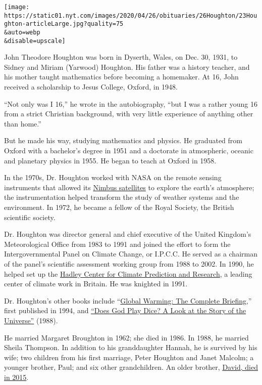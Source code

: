 \texttt{[image: https://static01.nyt.com/images/2020/04/26/obituaries/26Houghton/23Houghton-articleLarge.jpg?quality=75\\\&auto=webp\\\&disable=upscale]}

John Theodore Houghton was born in Dyserth, Wales, on Dec. 30, 1931, to
Sidney and Miriam (Yarwood) Houghton. His father was a history teacher,
and his mother taught mathematics before becoming a homemaker. At 16,
John received a scholarship to Jesus College, Oxford, in 1948.

``Not only was I 16,'' he wrote in the autobiography, ``but I was a
rather young 16 from a strict Christian background, with very little
experience of anything other than home.''

But he made his way, studying mathematics and physics. He graduated from
Oxford with a bachelor's degree in 1951 and a doctorate in atmospheric,
oceanic and planetary physics in 1955. He began to teach at Oxford in
1958.

In the 1970s, Dr. Houghton worked with NASA on the remote sensing
instruments that allowed its
\href{https://www.nasa.gov/content/goddard/nimbus-nasa-remembers-first-earth-observations}{Nimbus
satellites} to explore the earth's atmosphere; the instrumentation
helped transform the study of weather systems and the environment. In
1972, he became a fellow of the Royal Society, the British scientific
society.

Dr. Houghton was director general and chief executive of the United
Kingdom's Meteorological Office from 1983 to 1991 and joined the effort
to form the Intergovernmental Panel on Climate Change, or I.P.C.C. He
served as a chairman of the panel's scientific assessment working group
from 1988 to 2002. In 1990, he helped set up the
\href{https://www.metoffice.gov.uk/weather/climate-change/organisations-and-reports/met-office-hadley-centre}{Hadley
Center for Climate Prediction and Research}, a leading center of climate
work in Britain. He was knighted in 1991.

Dr. Houghton's other books include
``\href{https://www.amazon.com/gp/product/1107463793?ie=UTF8\&tag=thewaspos09-20\&camp=1789\&linkCode=xm2\&creativeASIN=1107463793}{Global
Warming: The Complete Briefing},'' first published in 1994, and
\href{https://www.amazon.com/Does-Play-Dice-Story-Universe/dp/0310515718}{``Does
God Play Dice? A Look at the Story of the Universe''} (1988).

He married Margaret Broughton in 1962; she died in 1986. In 1988, he
married Sheila Thompson. In addition to his granddaughter Hannah, he is
survived by his wife; two children from his first marriage, Peter
Houghton and Janet Malcolm; a younger brother, Paul; and six other
grandchildren. An older brother,
\href{https://rmets.onlinelibrary.wiley.com/doi/pdf/10.1002/wea.2566}{David,
died in 2015}.

